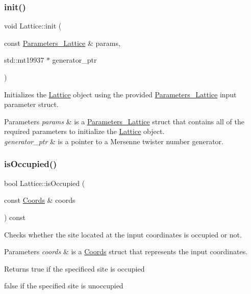 \subsubsection{\texorpdfstring{init()}{init()}}
{\footnotesize\ttfamily void Lattice\+::init (\begin{DoxyParamCaption}\item[{const \hyperlink{struct_parameters___lattice}{Parameters\+\_\+\+Lattice} \&}]{params,  }\item[{std\+::mt19937 $\ast$}]{generator\+\_\+ptr }\end{DoxyParamCaption})}



Initializes the \hyperlink{class_lattice}{Lattice} object using the provided \hyperlink{struct_parameters___lattice}{Parameters\+\_\+\+Lattice} input parameter struct. 


\begin{DoxyParams}{Parameters}
{\em params} & is a \hyperlink{struct_parameters___lattice}{Parameters\+\_\+\+Lattice} struct that contains all of the required parameters to initialize the \hyperlink{class_lattice}{Lattice} object. \\
\hline
{\em generator\+\_\+ptr} & is a pointer to a Mersenne twister number generator. \\
\hline
\end{DoxyParams}
\mbox{\label{class_lattice_a4d37afb6ad4c67f4f6462c2f6d5c337d}} 
\subsubsection{\texorpdfstring{is\+Occupied()}{isOccupied()}}
{\footnotesize\ttfamily bool Lattice\+::is\+Occupied (\begin{DoxyParamCaption}\item[{const \hyperlink{struct_coords}{Coords} \&}]{coords }\end{DoxyParamCaption}) const}



Checks whether the site located at the input coordinates is occupied or not. 


\begin{DoxyParams}{Parameters}
{\em coords} & is a \hyperlink{struct_coords}{Coords} struct that represents the input coordinates. \\
\hline
\end{DoxyParams}
\begin{DoxyReturn}{Returns}
true if the specificed site is occupied 

false if the specified site is unoccupied 
\end{DoxyReturn}
\mbox{\label{class_lattice_accf3b995e0d0cb422907728a29b1b523}} 
